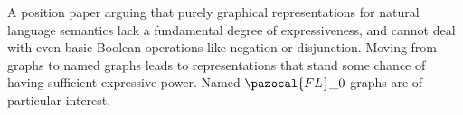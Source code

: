 A position paper arguing that purely graphical representations for natural language semantics lack a fundamental degree of expressiveness, and cannot deal with even basic Boolean operations like negation or disjunction. Moving from graphs to named graphs leads to representations that stand some chance of having sufficient expressive power. Named $\pazocal{FL}\_0$ graphs are of particular interest.
